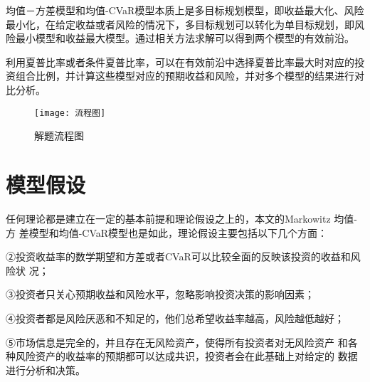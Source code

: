 \documentclass[withoutpreface,bwprint]{cumcmthesis} %
\begin{document}
	均值－方差模型和均值-CVaR模型本质上是多目标规划模型，即收益最大化、风险最小化，在给定收益或者风险的情况下，多目标规划可以转化为单目标规划，即风险最小模型和收益最大模型。通过相关方法求解可以得到两个模型的有效前沿。
	
	利用夏普比率或者条件夏普比率，可以在有效前沿中选择夏普比率最大时对应的投资组合比例，并计算这些模型对应的预期收益和风险，并对多个模型的结果进行对比分析。
		 \begin{figure}[H]
		\centering
		\texttt{[image: 流程图]}
		\caption{解题流程图}
		\label{流程图}
	\end{figure}
	
	\section{模型假设}
	任何理论都是建立在一定的基本前提和理论假设之上的，本文的Markowitz 均值-方
	差模型和均值-CVaR模型也是如此，理论假设主要包括以下几个方面：
	
	
	②投资收益率的数学期望和方差或者CVaR可以比较全面的反映该投资的收益和风险状
	况；
	
	③投资者只关心预期收益和风险水平，忽略影响投资决策的影响因素；
	
	④投资者都是风险厌恶和不知足的，他们总希望收益率越高，风险越低越好；
	
	⑤市场信息是完全的，并且存在无风险资产，使得所有投资者对无风险资产
	和各种风险资产的收益率的预期都可以达成共识，投资者会在此基础上对给定的
	数据进行分析和决策。
	
	
\end{document}
